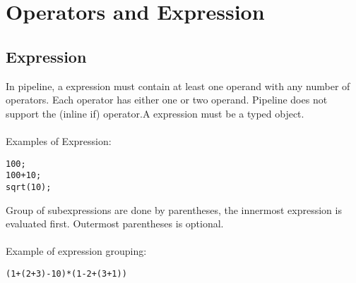 \documentclass[./LRM_main.tex]{subfiles}
\begin{document}


\chapter{Operators and Expression}
\section{Expression}
In pipeline, a expression must contain at least one operand with any number of operators. Each operator has either one or two operand. Pipeline does not support the (inline if) operator.A expression must be a typed object.\\ 
\vspace{1mm}\\
Examples of Expression:
\begin{lstlisting}
100;
100+10;
sqrt(10);
\end{lstlisting}
\vspace{1 mm}
Group of subexpressions are done by parentheses, the innermost expression is evaluated first. Outermost parentheses is optional.\\
\vspace{1 mm}\\
Example of expression grouping:
\begin{lstlisting}
(1+(2+3)-10)*(1-2+(3+1))
\end{lstlisting}
\end{document}
